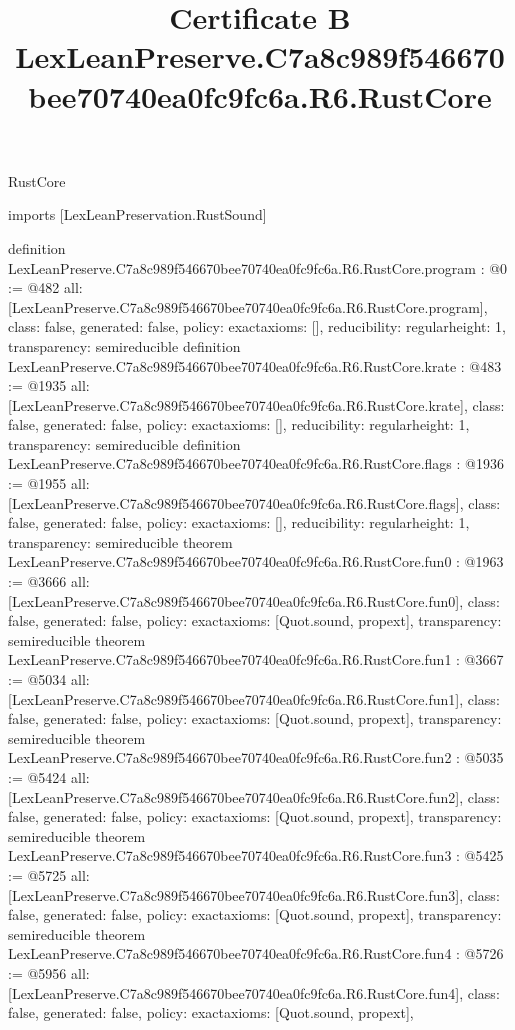 \begin{lexlean}{RustCore}
\title{Certificate B LexLeanPreserve.C7a8c989f546670bee70740ea0fc9fc6a.R6.RustCore}
\begin{coremodule}
imports [LexLeanPreservation.RustSound]

definition LexLeanPreserve.C7a8c989f546670bee70740ea0fc9fc6a.R6.RustCore.program : @0 := @482 {
  all: [LexLeanPreserve.C7a8c989f546670bee70740ea0fc9fc6a.R6.RustCore.program],
  class: false,
  generated: false,
  policy: exact{axioms: []},
  reducibility: regular{height: 1},
  transparency: semireducible
}
definition LexLeanPreserve.C7a8c989f546670bee70740ea0fc9fc6a.R6.RustCore.krate : @483 := @1935 {
  all: [LexLeanPreserve.C7a8c989f546670bee70740ea0fc9fc6a.R6.RustCore.krate],
  class: false,
  generated: false,
  policy: exact{axioms: []},
  reducibility: regular{height: 1},
  transparency: semireducible
}
definition LexLeanPreserve.C7a8c989f546670bee70740ea0fc9fc6a.R6.RustCore.flags : @1936 := @1955 {
  all: [LexLeanPreserve.C7a8c989f546670bee70740ea0fc9fc6a.R6.RustCore.flags],
  class: false,
  generated: false,
  policy: exact{axioms: []},
  reducibility: regular{height: 1},
  transparency: semireducible
}
theorem LexLeanPreserve.C7a8c989f546670bee70740ea0fc9fc6a.R6.RustCore.fun0 : @1963 := @3666 {
  all: [LexLeanPreserve.C7a8c989f546670bee70740ea0fc9fc6a.R6.RustCore.fun0],
  class: false,
  generated: false,
  policy: exact{axioms: [Quot.sound, propext]},
  transparency: semireducible
}
theorem LexLeanPreserve.C7a8c989f546670bee70740ea0fc9fc6a.R6.RustCore.fun1 : @3667 := @5034 {
  all: [LexLeanPreserve.C7a8c989f546670bee70740ea0fc9fc6a.R6.RustCore.fun1],
  class: false,
  generated: false,
  policy: exact{axioms: [Quot.sound, propext]},
  transparency: semireducible
}
theorem LexLeanPreserve.C7a8c989f546670bee70740ea0fc9fc6a.R6.RustCore.fun2 : @5035 := @5424 {
  all: [LexLeanPreserve.C7a8c989f546670bee70740ea0fc9fc6a.R6.RustCore.fun2],
  class: false,
  generated: false,
  policy: exact{axioms: [Quot.sound, propext]},
  transparency: semireducible
}
theorem LexLeanPreserve.C7a8c989f546670bee70740ea0fc9fc6a.R6.RustCore.fun3 : @5425 := @5725 {
  all: [LexLeanPreserve.C7a8c989f546670bee70740ea0fc9fc6a.R6.RustCore.fun3],
  class: false,
  generated: false,
  policy: exact{axioms: [Quot.sound, propext]},
  transparency: semireducible
}
theorem LexLeanPreserve.C7a8c989f546670bee70740ea0fc9fc6a.R6.RustCore.fun4 : @5726 := @5956 {
  all: [LexLeanPreserve.C7a8c989f546670bee70740ea0fc9fc6a.R6.RustCore.fun4],
  class: false,
  generated: false,
  policy: exact{axioms: [Quot.sound, propext]},
}
\end{coremodule}
\end{lexlean}
